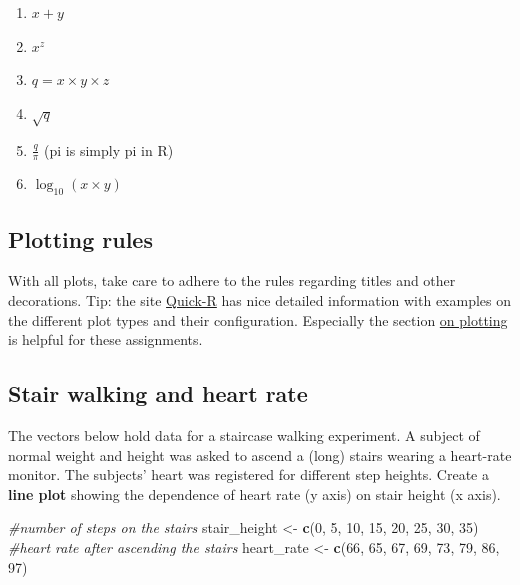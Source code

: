 \documentclass[]{book}
\newenvironment{Shaded}{\begin{snugshade}}{\end{snugshade}}
\newcommand{\CommentTok}[1]{\textcolor[rgb]{0.56,0.35,0.01}{\textit{#1}}}
\newcommand{\DecValTok}[1]{\textcolor[rgb]{0.00,0.00,0.81}{#1}}
\newcommand{\KeywordTok}[1]{\textcolor[rgb]{0.13,0.29,0.53}{\textbf{#1}}}
\newcommand{\NormalTok}[1]{#1}
\newcommand{\StringTok}[1]{\textcolor[rgb]{0.31,0.60,0.02}{#1}}
\providecommand{\tightlist}{%
  \setlength{\itemsep}{0pt}\setlength{\parskip}{0pt}}
\begin{document}
\begin{enumerate}
\def\labelenumi{\arabic{enumi}.}
\tightlist
\item
  \(x+y\)
\item
  \(x^z\)
\item
  \(q = x \times y \times z\)
\item
  \(\sqrt{q}\)
\item
  \(\frac{q}{\pi}\) (pi is simply pi in R)
\item
  \(\log_{10}{(x \times y)}\)
\end{enumerate}

\hypertarget{plotting-rules}{%
\subsection*{Plotting rules}\label{plotting-rules}}

With all plots, take care to adhere to the rules regarding titles and other decorations. Tip: the site \href{http://www.statmethods.net/}{Quick-R} has nice detailed information with examples on the different plot types and their configuration. Especially the section \href{http://www.statmethods.net/graphs/index.html}{on plotting} is helpful for these assignments.

\hypertarget{stair-walking-and-heart-rate}{%
\subsection{Stair walking and heart rate}\label{stair-walking-and-heart-rate}}

The vectors below hold data for a staircase walking experiment. A subject of normal weight and height was asked to ascend a (long) stairs wearing a heart-rate monitor. The subjects' heart was registered for different step heights. Create a \textbf{line plot} showing the dependence of heart rate (y axis) on stair height (x axis).

\begin{Shaded}
\begin{Highlighting}[]
\CommentTok{#number of steps on the stairs}
\NormalTok{stair_height <-}\StringTok{ }\KeywordTok{c}\NormalTok{(}\DecValTok{0}\NormalTok{, }\DecValTok{5}\NormalTok{, }\DecValTok{10}\NormalTok{, }\DecValTok{15}\NormalTok{, }\DecValTok{20}\NormalTok{, }\DecValTok{25}\NormalTok{, }\DecValTok{30}\NormalTok{, }\DecValTok{35}\NormalTok{)}
\CommentTok{#heart rate after ascending the stairs}
\NormalTok{heart_rate <-}\StringTok{ }\KeywordTok{c}\NormalTok{(}\DecValTok{66}\NormalTok{, }\DecValTok{65}\NormalTok{, }\DecValTok{67}\NormalTok{, }\DecValTok{69}\NormalTok{, }\DecValTok{73}\NormalTok{, }\DecValTok{79}\NormalTok{, }\DecValTok{86}\NormalTok{, }\DecValTok{97}\NormalTok{)}
\end{Highlighting}
\end{Shaded}
\end{document}
